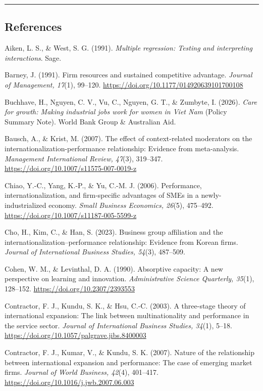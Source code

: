 \documentclass[12pt,a4paper]{article}
\begin{document}
\begin{center}\rule{0.5\linewidth}{0.5pt}\end{center}

\hypertarget{references}{%
\subsection{References}\label{references}}

Aiken, L. S., \& West, S. G. (1991). \emph{Multiple regression: Testing
and interpreting interactions}. Sage.

Barney, J. (1991). Firm resources and sustained competitive advantage.
\emph{Journal of Management, 17}(1), 99--120.
\url{https://doi.org/10.1177/014920639101700108}

Buchhave, H., Nguyen, C. V., Vu, C., Nguyen, G. T., \& Zumbyte, I.
(2026). \emph{Care for growth: Making industrial jobs work for women in
Viet Nam} (Policy Summary Note). World Bank Group \& Australian Aid.

Bausch, A., \& Krist, M. (2007). The effect of context-related
moderators on the internationalization-performance relationship:
Evidence from meta-analysis. \emph{Management International Review,
47}(3), 319--347. \url{https://doi.org/10.1007/s11575-007-0019-z}

Chiao, Y.-C., Yang, K.-P., \& Yu, C.-M. J. (2006). Performance,
internationalization, and firm-specific advantages of SMEs in a
newly-industrialized economy. \emph{Small Business Economics, 26}(5),
475--492. \url{https://doi.org/10.1007/s11187-005-5599-z}

Cho, H., Kim, C., \& Han, S. (2023). Business group affiliation and the
internationalization--performance relationship: Evidence from Korean
firms. \emph{Journal of International Business Studies, 54}(3),
487--509.

Cohen, W. M., \& Levinthal, D. A. (1990). Absorptive capacity: A new
perspective on learning and innovation. \emph{Administrative Science
Quarterly, 35}(1), 128--152. \url{https://doi.org/10.2307/2393553}

Contractor, F. J., Kundu, S. K., \& Hsu, C.-C. (2003). A three-stage
theory of international expansion: The link between multinationality and
performance in the service sector. \emph{Journal of International
Business Studies, 34}(1), 5--18.
\url{https://doi.org/10.1057/palgrave.jibs.8400003}

Contractor, F. J., Kumar, V., \& Kundu, S. K. (2007). Nature of the
relationship between international expansion and performance: The case
of emerging market firms. \emph{Journal of World Business, 42}(4),
401--417. \url{https://doi.org/10.1016/j.jwb.2007.06.003}
\end{document}
